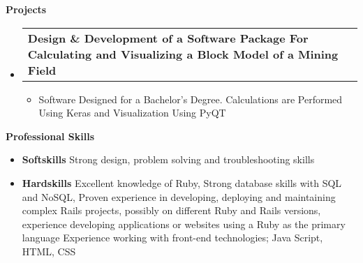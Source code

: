\documentclass[letterpaper,12pt]{article}[leftmargin=*]
\makeatletter
\def \entryspacing {-0pt}
\renewcommand{\section}[2]{\vspace{5pt}
  \colorbox{secondary}{\color{white}\raggedbottom\normalsize\textbf{{#1}{\hspace{7pt}#2}}}
}
\newcommand{\resumeEntryStart}{\begin{itemize}[leftmargin=2.5mm]}
\newcommand{\resumeEntryEnd}{\end{itemize}\vspace{\entryspacing}}
\newcommand{\resumeItemListStart}{\begin{itemize}[leftmargin=4.5mm]}
\newcommand{\resumeItemListEnd}{\end{itemize}}
\newcommand{\resumeItem}[1]{
  \item\small{
    {#1 \vspace{-2pt}}
  }
}
\newcommand{\resumeEntryTD}[2]{
  \vspace{-1pt}\item[]
    \begin{tabularx}{0.97\textwidth}{X@{\hspace{60pt}}r}
      \textbf{\color{primary}#1} & {\firabook\color{accent}\small#2} \\
    \end{tabularx}\vspace{-6pt}
}
\newcommand{\resumeEntryS}[2]{
  \item[]\small{
    \textbf{\color{primary}#1 }{ #2 \vspace{-6pt}}
  }
}
\makeatother
\begin{document}
\section{\faFlask}{Projects}

  \resumeEntryStart
    \resumeEntryTD
      {Design \& Development of a Software Package For Calculating and Visualizing a Block Model of a Mining Field}{}
    \resumeItemListStart
      \resumeItem {Software Designed for a Bachelor's Degree. Calculations are Performed Using Keras and Visualization Using PyQT}
    \resumeItemListEnd
  \resumeEntryEnd

\section{\faGears}{Professional Skills} 
 \resumeEntryStart
  \resumeEntryS{Softskills} {Strong design, problem solving and troubleshooting skills}
  \resumeEntryS{Hardskills} {Excellent knowledge of Ruby, Strong database skills with SQL and NoSQL, Proven experience in developing, deploying and maintaining complex Rails projects, possibly on different Ruby and Rails versions, experience developing applications or websites using a Ruby as the primary language Experience working with front-end technologies; Java Script, HTML, CSS}
 \resumeEntryEnd
\end{document}
